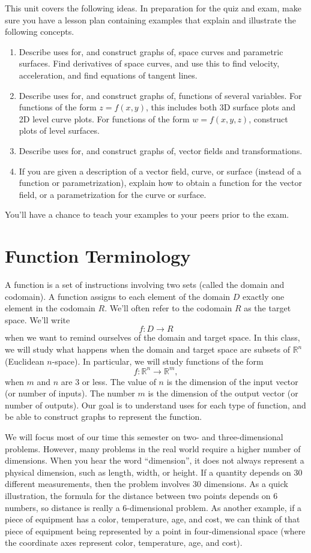
\noindent 
This unit covers the following ideas. In preparation for the quiz and exam, make sure you have a lesson plan containing examples that explain and illustrate the following concepts.  
\begin{enumerate}
\item Describe uses for, and construct graphs of, space curves and parametric surfaces. Find derivatives of space curves, and use this to find velocity, acceleration, and find equations of tangent lines.
\item Describe uses for, and construct graphs of, functions of several variables. For functions of the form $z=f(x,y)$, this includes both 3D surface plots and 2D level curve plots.  For functions of the form $w=f(x,y,z)$, construct plots of level surfaces.
\item Describe uses for, and construct graphs of, vector fields and transformations.
\item If you are given a description of a vector field, curve, or surface (instead of a function or parametrization), explain how to obtain a function for the vector field, or a parametrization for the curve or surface.
\end{enumerate}
You'll have a chance to teach your examples to your peers prior to the exam.


\section{Function Terminology}
A function is a set of instructions involving two sets (called the domain and codomain).  A function assigns to each element of the domain $D$ exactly one element in the codomain $R$. We'll often refer to the codomain $R$ as the target space.  We'll write {$$f\colon D\to R$$} when we want to remind ourselves of the domain and target space.  In this class, we will study what happens when the domain and target space are subsets of {${\mathbb{R}}^n$} (Euclidean {$n$}-space).  In particular, we will study functions of the form $$f\colon {\mathbb{R}}^n\to {\mathbb{R}}^m,$$ when $m$ and $n$ are 3 or less. The value of $n$ is the dimension of the input vector (or number of inputs).  The number $m$ is the dimension of the output vector (or number of outputs).  Our goal is to understand uses for each type of function, and be able to construct graphs to represent the function.

We will focus most of our time this semester on two- and three-dimensional problems. However, many problems in the real world require a higher number of dimensions. When you hear the word ``dimension'', it does not always represent a physical dimension, such as length, width, or height.  If a quantity depends on 30 different measurements, then the problem involves 30 dimensions.  As a quick illustration, the formula for the distance between two points depends on 6 numbers, so distance is really a 6-dimensional problem.  As another example, if a piece of equipment has a color, temperature, age, and cost, we can think of that piece of equipment being represented by a point in four-dimensional space (where the coordinate axes represent color, temperature, age, and cost).


